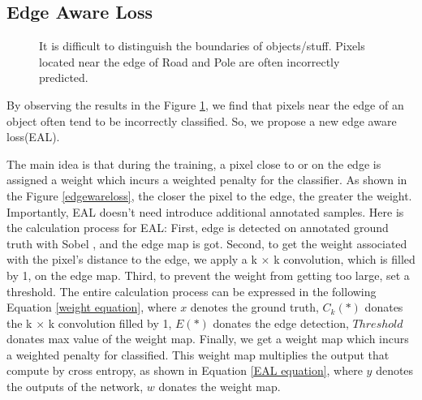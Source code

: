 \documentclass[final]{cvpr}
\begin{document}
\subsection{Edge Aware Loss}


\begin{figure}
\begin{center}
\end{center}
\caption{ It is difficult to distinguish the boundaries of objects/stuff. Pixels located near the edge of Road and Pole are often incorrectly predicted. }
\label{EAL_error}
\end{figure}



By observing the results in the Figure \ref{EAL_error}, we find that pixels near the edge of an object often tend to be incorrectly classified. So, we propose a new edge aware loss(EAL).

The main idea is that during the training, a pixel close to or on the edge is assigned a weight which incurs a weighted penalty for the classifier. As shown in the Figure \ref{edgewareloss}, the closer the pixel to the edge, the greater the weight. Importantly, EAL doesn't need introduce additional annotated samples. Here is the calculation process for EAL: First, edge is detected on annotated ground truth with Sobel \cite{Duda1973Pattern}, and the edge map is got. Second, to get the weight associated with the pixel's distance to the edge, we apply a k $\times$ k convolution, which is filled by 1, on the edge map. Third, to prevent the weight from getting too large, set a threshold. The entire calculation process can be expressed in the following Equation \ref{weight equation}, where $x$ denotes the ground truth, $C_{k}(*)$ donates the k $\times$ k convolution filled by 1, $E(*)$ donates the edge detection, $Threshold$ donates max value of the weight map. Finally, we get a weight map which incurs a weighted penalty for classified. This weight map multiplies the output that compute by cross entropy, as shown in Equation \ref{EAL equation}, where $y$ denotes the outputs of the network, $w$ donates the weight map.
\end{document}
